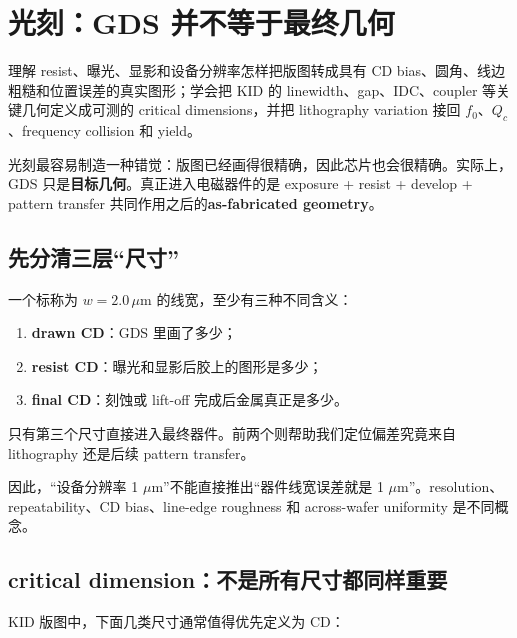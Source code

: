\chapter{光刻：GDS 并不等于最终几何}

\begin{chaptergoal}
理解 resist、曝光、显影和设备分辨率怎样把版图转成具有 CD bias、圆角、线边粗糙和位置误差的真实图形；学会把 KID 的 linewidth、gap、IDC、coupler 等关键几何定义成可测的 critical dimensions，并把 lithography variation 接回 $f_0$、$Q_c$、frequency collision 和 yield。
\end{chaptergoal}

光刻最容易制造一种错觉：版图已经画得很精确，因此芯片也会很精确。实际上，GDS 只是\textbf{目标几何}。真正进入电磁器件的是 exposure + resist + develop + pattern transfer 共同作用之后的\textbf{as-fabricated geometry}。


\section{先分清三层“尺寸”}

一个标称为 $w=2.0\,\mu\mathrm{m}$ 的线宽，至少有三种不同含义：

\begin{enumerate}
  \item \textbf{drawn CD}：GDS 里画了多少；
  \item \textbf{resist CD}：曝光和显影后胶上的图形是多少；
  \item \textbf{final CD}：刻蚀或 lift-off 完成后金属真正是多少。
\end{enumerate}

只有第三个尺寸直接进入最终器件。前两个则帮助我们定位偏差究竟来自 lithography 还是后续 pattern transfer。

因此，“设备分辨率 1 $\mu$m”不能直接推出“器件线宽误差就是 1 $\mu$m”。resolution、repeatability、CD bias、line-edge roughness 和 across-wafer uniformity 是不同概念。

\section{critical dimension：不是所有尺寸都同样重要}

KID 版图中，下面几类尺寸通常值得优先定义为 CD：

